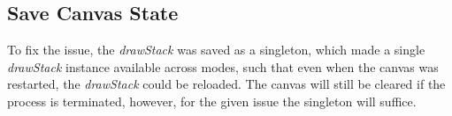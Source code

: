 \subsection{Save Canvas State}
To fix the issue, the \textit{drawStack} was saved as a singleton, which made a single \textit{drawStack} instance available across modes, such that even when the canvas was restarted, the \textit{drawStack} could be reloaded. 
The canvas will still be cleared if the process is terminated, however, for the given issue the singleton will suffice.